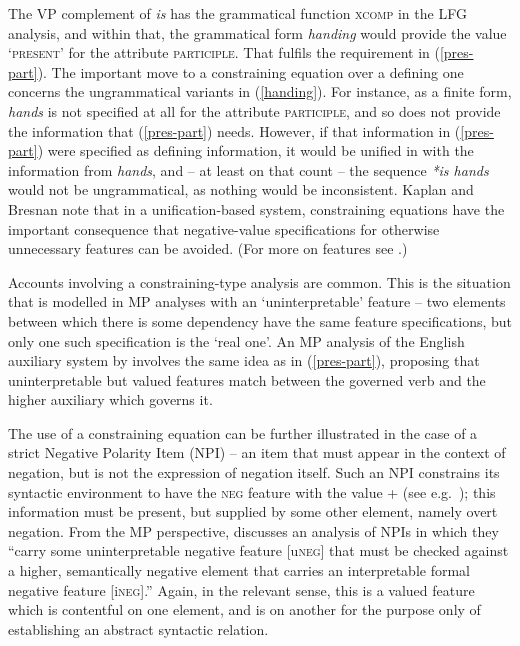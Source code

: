\documentclass[output=paper,hidelinks]{langscibook}
\begin{document}

The VP complement of \textit{is} has the grammatical function
\textsc{xcomp} in the LFG analysis, and within that, the grammatical
form \textit{handing} would provide the value `\textsc{present}' for the
attribute \textsc{participle}. That fulfils the requirement in
(\ref{pres-part}). The important move to a constraining equation over a
defining one concerns the ungrammatical variants in
(\ref{handing}). For instance, as a finite form, \textit{hands} is not
specified at all for the attribute \textsc{participle}, and so does
not provide the information that (\ref{pres-part}) needs. However, if that
information in (\ref{pres-part}) were specified as defining information, it
would be unified in with the information from \textit{hands}, and -- at
least on that count -- the sequence \textit{*is hands} would not be
ungrammatical, as nothing would be inconsistent. Kaplan and Bresnan
note that in a unification-based system, constraining equations have
the important consequence that negative-value specifications for
otherwise unnecessary features can be avoided. (For more on features
see \citealp{kaplan18}.)

Accounts involving a constraining-type analysis are common. This is
the situation that is modelled in MP analyses with an
`uninterpretable' feature -- two elements between which there is
some dependency have the same feature specifications, but only one
such specification is the `real one'. An MP analysis of the English
auxiliary system by \citet{aelbharw15} involves the same idea as in
(\ref{pres-part}), proposing that uninterpretable but valued features
match between the governed verb and the higher auxiliary which governs
it.

The use of a constraining equation can be further illustrated in the
case of a strict Negative Polarity Item (NPI) -- an item that must appear
in the context of negation, but is not the expression of negation
itself. Such an NPI constrains its syntactic environment to have the
\textsc{neg} feature with the value + (see e.g.~\citealp{sellsneg});
this information must be present, but supplied by some other element,
namely overt negation. From the MP perspective, \citet{zeijlstra15}
discusses an analysis of NPIs in which they ``carry some
uninterpretable negative feature [u\textsc{neg}] that must be checked
against a higher, semantically negative element that carries an
interpretable formal negative feature [i\textsc{neg}].''  Again, in
the relevant sense, this is a valued feature which is contentful on
one element, and is on another for the purpose only of establishing an
abstract syntactic relation.
\end{document}
